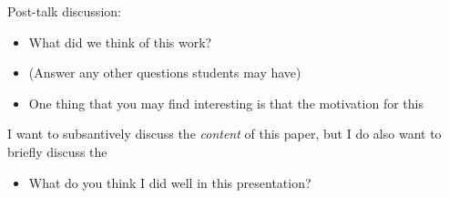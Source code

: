 \documentclass[11pt]{article}
\begin{document}
Post-talk discussion:
\begin{itemize}
    \item What did we think of this work?
    \item (Answer any other questions students may have)
    \item One thing that you may find interesting is that the motivation for this 
\end{itemize}

I want to subsantively discuss the {\it content} of this paper, but I do also want to briefly discuss the 
\begin{itemize}
    \item What do you think I did well in this presentation?
\end{itemize}
\end{document}
